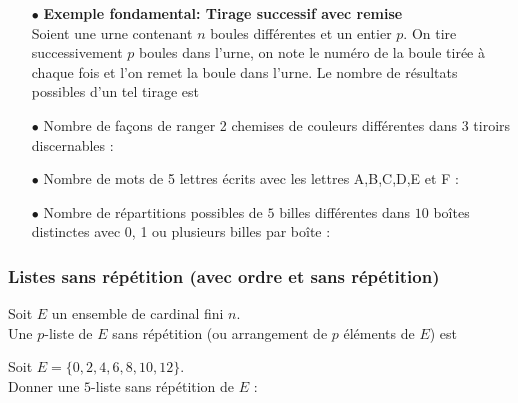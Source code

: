 \documentclass[a4paper, 11pt]{article}
\begin{document}
\noindent \begin{exemples} 
\begin{itemize}
\item[$\bullet$] \textbf{Exemple fondamental: Tirage successif avec remise}\\
\noindent Soient une urne contenant $n$ boules diff\'erentes et un entier $p$. On tire successivement $p$ boules dans l'urne, on note le num\'ero de la boule tir\'ee \`a chaque fois et l'on remet la boule dans l'urne. Le nombre de r\'esultats possibles d'un tel tirage est \dotfill\vsec
\item[$\bullet$] Nombre de fa\c{c}ons de ranger 2 chemises de couleurs diff\'erentes dans 3 tiroirs discernables : \dotfill\vsec
\item[$\bullet$] Nombre de mots de 5 lettres \'ecrits avec les lettres A,B,C,D,E et F : \dotfill \vsec
\item[$\bullet$] Nombre de r\'epartitions possibles de $5$ billes diff\'erentes dans $10$ bo\^{i}tes distinctes avec 0, 1 ou plusieurs billes par bo\^{i}te : \dotfill \vsec
\end{itemize}
\end{exemples}

 



\subsubsection{Listes sans r\'ep\'etition (avec ordre et sans r\'ep\'etition)}


\begin{defi} 
Soit $E$ un ensemble de cardinal fini $n$.\\
Une $p$-liste de $E$ sans r\'ep\'etition (ou arrangement de $p$ \'el\'ements de $E$) est 
\end{defi}

\begin{exemple} 
Soit $E=\lbrace 0,2,4,6,8,10,12\rbrace$. \\
Donner une $5$-liste sans r\'ep\'etition de $E$ : \dotfill 
\end{exemple}
\end{document}
